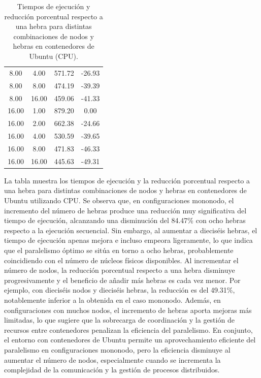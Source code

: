 \begin{table}[ht]
\begin{tabular}{|c|c|c|c|}
        8.00           & 4.00            & 571.72              & -26.93                         \\
        8.00           & 8.00            & 474.19              & -39.39                         \\
        8.00           & 16.00           & 459.06              & -41.33                         \\
        16.00          & 1.00            & 879.20              & 0.00                           \\
        16.00          & 2.00            & 662.38              & -24.66                         \\
        16.00          & 4.00            & 530.59              & -39.65                         \\
        16.00          & 8.00            & 471.83              & -46.33                         \\
        16.00          & 16.00           & 445.63              & -49.31                         \\
        \hline
    \end{tabular}
    \caption{Tiempos de ejecución y reducción porcentual respecto a una hebra para distintas combinaciones de nodos y hebras en contenedores de Ubuntu (CPU).}
    \label{tab:thread_sweep_ubuntu_docker_time}
\end{table}

La tabla muestra los tiempos de ejecución y la reducción porcentual respecto a una hebra para distintas combinaciones de nodos y hebras en contenedores de Ubuntu utilizando CPU. Se observa que, en configuraciones mononodo, el incremento del número de hebras produce una reducción muy significativa del tiempo de ejecución, alcanzando una disminución del 84.47\% con ocho hebras respecto a la ejecución secuencial. Sin embargo, al aumentar a dieciséis hebras, el tiempo de ejecución apenas mejora e incluso empeora ligeramente, lo que indica que el paralelismo óptimo se sitúa en torno a ocho hebras, probablemente coincidiendo con el número de núcleos físicos disponibles. Al incrementar el número de nodos, la reducción porcentual respecto a una hebra disminuye progresivamente y el beneficio de añadir más hebras es cada vez menor. Por ejemplo, con dieciséis nodos y dieciséis hebras, la reducción es del 49.31\%, notablemente inferior a la obtenida en el caso mononodo. Además, en configuraciones con muchos nodos, el incremento de hebras aporta mejoras más limitadas, lo que sugiere que la sobrecarga de coordinación y la gestión de recursos entre contenedores penalizan la eficiencia del paralelismo. En conjunto, el entorno con contenedores de Ubuntu permite un aprovechamiento eficiente del paralelismo en configuraciones mononodo, pero la eficiencia disminuye al aumentar el número de nodos, especialmente cuando se incrementa la complejidad de la comunicación y la gestión de procesos distribuidos.

